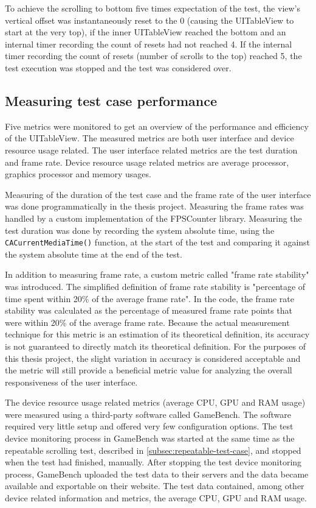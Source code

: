 \documentclass[a4paper,12pt]{article}
\begin{document}
To achieve the scrolling to bottom five times expectation of the test, the view's vertical offset was instantaneously reset to the 0 (causing the UITableView to start at the very top), if the inner UITableView reached the bottom and an internal timer recording the count of resets had not reached 4. If the internal timer recording the count of resets (number of scrolls to the top) reached 5, the test execution was stopped and the test was considered over.

\subsection{Measuring test case performance}
\label{subsec:measuring-test-case-performance}
Five metrics were monitored to get an overview of the performance and efficiency of the UITableView. The measured metrics are both user interface and device resource usage related. The user interface related metrics are the test duration and frame rate. Device resource usage related metrics are average processor, graphics processor and memory usages.

Measuring of the duration of the test case and the frame rate of the user interface was done programmatically in the thesis project. Measuring the frame rates was handled by a custom implementation of the FPSCounter\cite{FPSCounterGithub} library. Measuring the test duration was done by recording the system absolute time, using the \texttt{CACurrentMediaTime()} function, at the start of the test and comparing it against the system absolute time at the end of the test.

In addition to measuring frame rate, a custom metric called "frame rate stability" was introduced. The simplified definition of frame rate stability is "percentage of time spent within 20\% of the average frame rate". In the code, the frame rate stability was calculated as the percentage of measured frame rate points that were within 20\% of the average frame rate. Because the actual measurement technique for this metric is an estimation of its theoretical definition, its accuracy is not guaranteed to directly match its theoretical definition. For the purposes of this thesis project, the slight variation in accuracy is considered acceptable and the metric will still provide a beneficial metric value for analyzing the overall responsiveness of the user interface.

The device resource usage related metrics (average CPU, GPU and RAM usage) were measured using a third-party software called GameBench\cite{GameBenchHome}. The software required very little setup and offered very few configuration options. The test device monitoring process in GameBench was started at the same time as the repeatable scrolling test, described in \autoref{subsec:repeatable-test-case}, and stopped when the test had finished, manually. After stopping the test device monitoring process, GameBench uploaded the test data to their servers and the data became available and exportable on their website. The test data contained, among other device related information and metrics, the average CPU, GPU and RAM usage.
\end{document}
